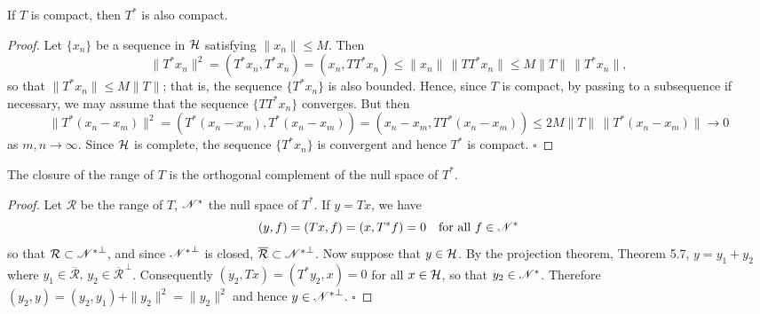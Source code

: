 \begin{lemma}\label{gt.lem5.9}
If $T$ is compact, then $T^*$ is also compact.
\end{lemma}

\begin{proof}
Let $\{x_n\}$ be a sequence in $\mathcal{H}$ satisfying $\|x_n\|\le M$. Then
\[
\|T^*x_n\|^2=(T^*x_n,T^*x_n)=(x_n,TT^*x_n)
\le \|x_n\|\,\|TT^*x_n\|
\le M\|T\|\,\|T^*x_n\|,
\]
so that $\|T^*x_n\|\le M\|T\|$; that is, the sequence $\{T^*x_n\}$ is also bounded. Hence, since $T$ is compact, by passing to a subsequence if necessary, we may assume that the sequence $\{TT^*x_n\}$ converges. But then
\[
\|T^*(x_n-x_m)\|^2=(T^*(x_n-x_m),T^*(x_n-x_m))
=(x_n-x_m,TT^*(x_n-x_m))
\le 2M\|T\|\,\|T^*(x_n-x_m)\|\to 0
\]
as $m,n\to\infty$.
Since $\mathcal{H}$ is complete, the sequence $\{T^*x_n\}$ is convergent and hence $T^*$ is compact. $\square$
\end{proof}

\begin{lemma}\label{gt.lem5.10}
The closure of the range of $T$ is the orthogonal complement of the null space of $T^*$.
\end{lemma}

\begin{proof}
Let $\mathcal R$ be the range of $T$, $\mathscr{N}^*$ the null space of $T^*$. If $y=Tx$, we have
\[
(y,f)=(Tx,f)=(x,T^*f)=0 \quad \text{for all } f\in \mathscr{N}^*
\]
so that $\mathcal R\subset {\mathscr{N}^*}^{\perp}$, and since ${\mathscr{N}^*}^{\perp}$ is closed, $\overline{\mathcal R}\subset {\mathscr{N}^*}^{\perp}$. Now suppose that $y\in \mathcal{H}$. By the projection theorem, Theorem 5.7, $y=y_1+y_2$ where $y_1\in \overline{\mathcal R},\, y_2\in \overline{\mathcal R}^{\,\perp}$. Consequently $(y_2,Tx)=(T^*y_2,x)=0$ for all $x\in \mathcal{H}$, so that $y_2\in \mathscr{N}^*$. Therefore $(y_2,y)=(y_2,y_1)+\|y_2\|^2=\|y_2\|^2$ and hence $y\in {\mathscr{N}^*}^{\perp}$. $\square$
\end{proof}

